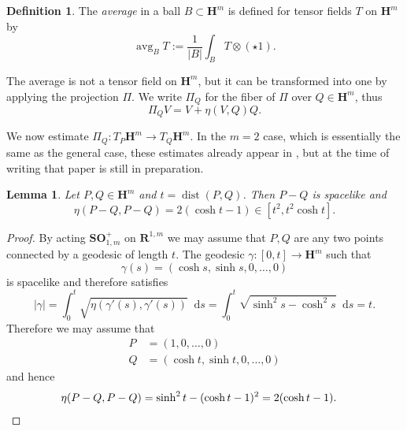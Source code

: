 \documentclass[reqno,12pt,letterpaper]{amsart}
\newcommand{\RR}{\mathbf{R}}
\newcommand{\Hyp}{\mathbf H}
\newcommand{\SpOrth}{\mathbf{SO}}
\DeclareMathOperator{\avg}{avg}
\newcommand*\dif{\mathop{}\!\mathrm{d}}
\DeclareMathOperator{\dist}{dist}
\newcommand{\dfn}[1]{\emph{#1}\index{#1}}
\newtheorem{lemma}[theorem]{Lemma}
\theoremstyle{definition}
\newtheorem{definition}[theorem]{Definition}
\numberwithin{equation}{section}
\begin{document}
\begin{definition}
The \dfn{average} in a ball $B \subset \Hyp^m$ is defined for tensor fields $T$ on $\Hyp^m$ by 
$$\avg_B T := \frac{1}{|B|} \int_B T \otimes (\star 1).$$
\end{definition}

The average is not a tensor field on $\Hyp^m$, but it can be transformed into one by applying the projection $\Pi$.
We write $\Pi_Q$ for the fiber of $\Pi$ over $Q \in \Hyp^m$, thus
\begin{equation}\label{projection formula}
\Pi_Q V = V + \eta(V, Q)Q.
\end{equation}

We now estimate $\Pi_Q: T_P\Hyp^m \to T_Q\Hyp^m$.
In the $m = 2$ case, which is essentially the same as the general case, these estimates already appear in \cite{daskalopoulosPrep1}, but at the time of writing that paper is still in preparation.

\begin{lemma}
Let $P, Q \in \Hyp^m$ and $t = \dist(P, Q)$. Then $P - Q$ is spacelike and 
$$\eta(P - Q, P - Q) = 2(\cosh t - 1) \in [t^2, t^2 \cosh t].$$
\end{lemma}
\begin{proof}
By acting $\SpOrth^+_{1, m}$ on $\RR^{1, m}$ we may assume that $P, Q$ are any two points connected by a geodesic of length $t$.
The geodesic $\gamma: [0, t] \to \Hyp^m$ such that
$$\gamma(s) = (\cosh s, \sinh s, 0, \dots, 0)$$
is spacelike and therefore satisfies
$$|\gamma| = \int_0^t \sqrt{\eta(\gamma'(s), \gamma'(s))} \dif s = \int_0^t \sqrt{\sinh^2 s - \cosh^2 s} \dif s = t.$$
Therefore we may assume that
\begin{align*}
P &= (1, 0, \dots, 0) \\
Q &= (\cosh t, \sinh t, 0, \dots, 0)
\end{align*}
and hence
\begin{align*}
\eta(P - Q, P - Q) &= \sinh^2 t - (\cosh t - 1)^2 = 2(\cosh t - 1). \qedhere 
\end{align*}
\end{proof}
\end{document}

